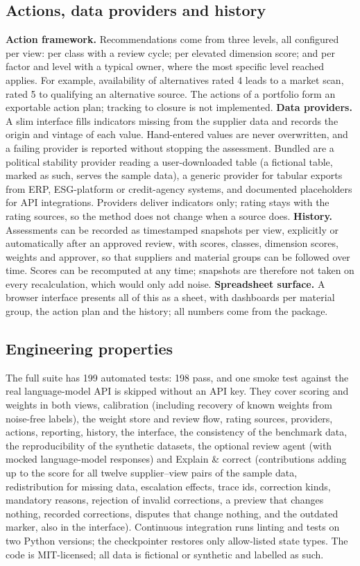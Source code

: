 \documentclass[10pt,twocolumn,a4paper]{article}
\begin{document}
\subsection{Actions, data providers and history}
\label{sec:actions}
\textbf{Action framework.} Recommendations come from three levels, all configured per
view: per class with a review cycle; per elevated dimension score; and per factor and
level with a typical owner, where the most specific level reached applies. For example,
availability of alternatives rated 4 leads to a market scan, rated 5 to qualifying an
alternative source. The actions of a portfolio form an exportable action plan; tracking
to closure is not implemented.
\textbf{Data providers.} A slim interface fills indicators missing from the supplier data
and records the origin and vintage of each value. Hand-entered values are never
overwritten, and a failing provider is reported without stopping the assessment.
Bundled are a political stability provider reading a user-downloaded table (a fictional
table, marked as such, serves the sample data), a generic provider for tabular exports
from ERP, ESG-platform or credit-agency systems, and documented placeholders for API
integrations. Providers deliver indicators only; rating stays with the rating sources, so
the method does not change when a source does.
\textbf{History.} Assessments can be recorded as timestamped snapshots per view,
explicitly or automatically after an approved review, with scores, classes, dimension
scores, weights and approver, so that suppliers and material groups can be followed over
time. Scores can be recomputed at any time; snapshots are therefore not taken on every
recalculation, which would only add noise.
\textbf{Spreadsheet surface.} A browser interface presents all of this as a sheet, with
dashboards per material group, the action plan and the history; all numbers come from the
package.

\subsection{Engineering properties}
The full suite has 199 automated tests: 198 pass, and one smoke test against the real
language-model API is skipped without an API key. They cover scoring and weights in both
views, calibration (including recovery of known weights from noise-free labels), the
weight store and review flow, rating sources, providers, actions, reporting, history, the
interface, the consistency of the benchmark data, the reproducibility of the synthetic
datasets, the optional review agent (with mocked language-model responses) and Explain \&
correct (contributions adding up to the score for all twelve supplier--view pairs of the sample
data, redistribution for missing data, escalation effects, trace ids, correction kinds,
mandatory reasons, rejection of invalid corrections, a preview that changes nothing, recorded
corrections, disputes that change nothing, and the outdated marker, also in the interface). Continuous integration runs linting and tests on two Python versions; the
checkpointer restores only allow-listed state types. The code is MIT-licensed; all data
is fictional or synthetic and labelled as such.
\end{document}
